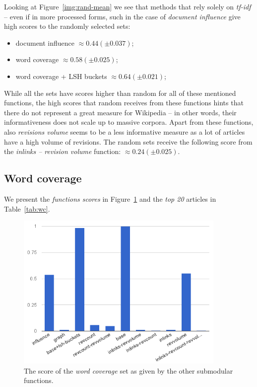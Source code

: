 Looking at Figure~\ref{img:rand-mean} we see that methods that rely solely on
\emph{tf-idf} -- even if in more processed forms, such in the case of
\emph{document influence} give high scores to the randomly selected sets:
\begin{itemize}
  \item document influence \(\approx 0.44 (\pm 0.037)\);
  \item word coverage \(\approx 0.58 (\pm 0.025)\);
  \item word coverage + LSH buckets \(\approx 0.64 (\pm 0.021)\);
\end{itemize}
While all the sets have scores higher than random for all of these mentioned
functions, the high scores that random receives from these functions hints that
there do not represent a great measure for Wikipedia -- in other words, their
informativeness does not scale up to massive corpora.
Apart from these functions, also \emph{revisions volume} seems to be a less
informative measure as a lot of articles have a high volume of revisions.
The random sets receive the following score from the \emph{inlinks -- revision
volume} function: \(\approx 0.24 (\pm 0.025)\).

\subsection{Word coverage}

We present the \emph{functions scores} in Figure~\ref{img:wc} and the \emph{top
20} articles in Table~\ref{tab:wc}.

\begin{figure}
  \centering
  \includegraphics[width=0.9\textwidth,natwidth=555,natheight=419]{images/wc.png}
  \caption{The score of the \emph{word coverage} set as given by the other
  submodular functions.}
  \label{img:wc}
\end{figure}

